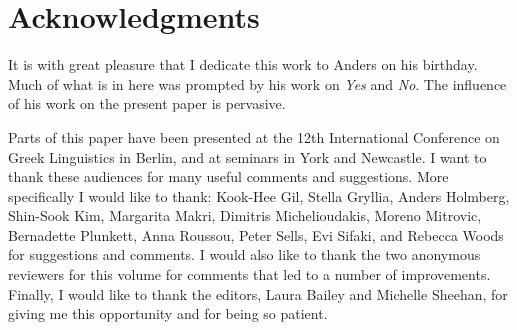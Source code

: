 \documentclass[output=paper]{LSP/langsci}
\begin{document}
\section*{Acknowledgments}
It is with great pleasure that I dedicate this work to Anders on his birthday.  Much of what is in here was prompted by his work on \textit{Yes} and \textit{No}. The influence of his work on the present paper is pervasive.  

Parts of this paper have been presented at the 12th International Conference on {Greek} Linguistics in Berlin, and at seminars in York and Newcastle.  I want to thank these audiences for many useful comments and suggestions.  More specifically I would like to thank: Kook-Hee Gil,  Stella Gryllia, Anders Holmberg, Shin-Sook Kim, Margarita Makri,  Dimitris Michelioudakis, Moreno Mitrovic, Bernadette Plunkett, Anna Roussou,  Peter Sells, Evi Sifaki, and Rebecca Woods for suggestions and comments.  I would also like to thank the two anonymous reviewers for this volume for comments that led to a {number} of improvements.  Finally, I would like to thank the editors, Laura Bailey and Michelle Sheehan, for giving me this opportunity and for being so patient.
{\sloppy
\printbibliography[heading=subbibliography,notkeyword=this]
}
\end{document}
